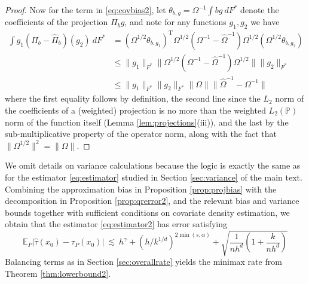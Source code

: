 \documentclass[11pt,twoside]{article}
\def\T{{ \mathrm{\scriptscriptstyle T} }}
\newcommand{\Pb}{\mathbb{P}}
\newcommand{\E}{\mathbb{E}}
\theoremstyle{definition}
\theoremstyle{remark}
\begin{document}
\begin{proof}
Now for the term in  \eqref{eq:covbias2}, let $\theta_{b,g} = \Omega^{-1} \int b g \ dF^*$ denote the coefficients of the projection $\Pi_{b}g$, and note for any functions $g_1,g_2$ we have
\begin{align*}
\int g_1(\Pi_{b} - \widehat\Pi_{b})(g_2) \ dF^* %
&= \left( \Omega^{1/2} \theta_{b, g_1} \right)^\T \Omega^{1/2} (\Omega^{-1} - \widehat\Omega^{-1}) \Omega^{1/2}  \left( \Omega^{1/2} \theta_{b, g_2} \right) \\
&\leq \| g_1 \|_{F^*}  \| \Omega^{1/2} (\Omega^{-1} - \widehat\Omega^{-1}) \Omega^{1/2}  \| \| g_2 \|_{F^*} \\
&\leq  \| g_1 \|_{F^*} \| g_2 \|_{F^*}  \|  \Omega \| \| \widehat\Omega^{-1} - \Omega^{-1} \|  
\end{align*}
where the first equality follows by definition, the second line since the $L_2$ norm of the coefficients of a (weighted) projection is no more than the weighted $L_2(\Pb)$ norm of the function itself (Lemma \ref{lem:projections}(iii)), and the last by the sub-multiplicative property of the operator norm, along with the fact that $\| \Omega^{1/2} \|^2 = \| \Omega \|$. 
\end{proof}

\bigskip

We omit details on variance calculations because the logic is exactly the same as for the estimator \eqref{eq:estimator} studied in Section \ref{sec:variance} of the main text. \\

Combining the approximation bias in Proposition \ref{prop:projbias} with the decomposition in Proposition \ref{prop:qrerror2}, and the relevant bias and variance bounds together with sufficient conditions on covariate density estimation, we obtain that the estimator \eqref{eq:estimator2} has error satisfying
\begin{equation} \label{eq:overallrate2}
 \E_P | \widehat\tau(x_0) - \tau_P(x_0) |  \ \lesssim \ h^\gamma + \left( h/k^{1/d} \right)^{2\min(s,\alpha)} + \sqrt{\frac{1}{nh^d} \left( 1 + \frac{k}{nh^d} \right) } 
 \end{equation}
Balancing terms as in Section \ref{sec:overallrate} yields the minimax rate from Theorem \ref{thm:lowerbound2}. \\
\end{document}

